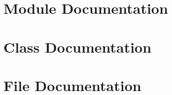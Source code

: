 \documentclass[twoside]{book}
\begin{document}
\chapter{Module Documentation}

\chapter{Class Documentation}

















\chapter{File Documentation}



\newpage
{}
{}
\printindex
\end{document}
